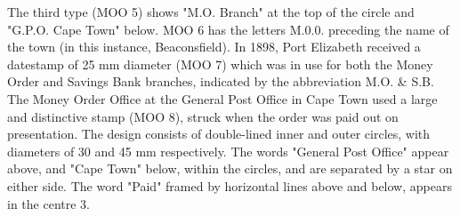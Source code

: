 The third type (MOO 5) shows "M.O. Branch" at the top of the 
circle and "G.P.O. Cape Town" below. MOO 6 has the letters 
M.0.0. preceding the name of the town (in this instance, Beaconsfield). 
In 1898, Port Elizabeth received a datestamp of 25 mm diameter (MOO 7) 
which was in use for both the Money Order and Savings Bank branches, 
indicated by the abbreviation M.O. \& S.B. The Money Order Office 
at the General Post Office in Cape Town used a large and 
distinctive stamp (MOO 8), struck when the order was paid out 
on presentation. The design consists of double-lined inner and 
outer circles, with diameters of 30 and 45 mm respectively. 
The words "General Post Office" appear above, and "Cape Town" below, 
within the circles, and are separated by a star on either side. 
The word "Paid" framed by horizontal lines above and below, 
appears in the centre 3.

 
    